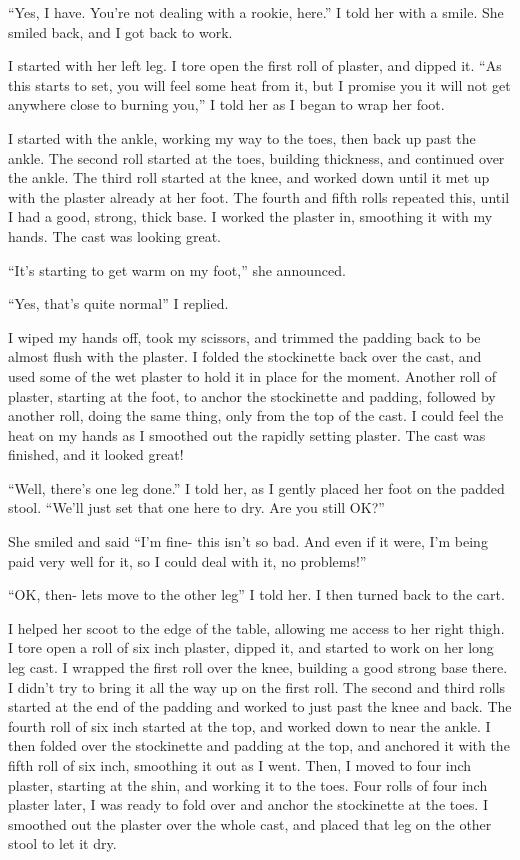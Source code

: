     ``Yes, I have. You're not dealing with a rookie, here.'' I told her with a smile. She smiled
back, and I got back to work.

    I started with her left leg. I tore open the first roll of plaster, and dipped it. ``As this
starts to set, you will feel some heat from it, but I promise you it will not get anywhere close
to burning you,'' I told her as I began to wrap her foot.

    I started with the ankle, working my way to the toes, then back up past the ankle. The
second roll started at the toes, building thickness, and continued over the ankle. The third
roll started at the knee, and worked down until it met up with the plaster already at her foot.
The fourth and fifth rolls repeated this, until I had a good, strong, thick base. I worked the
plaster in, smoothing it with my hands. The cast was looking great.

    ``It's starting to get warm on my foot,'' she announced.

    ``Yes, that's quite normal'' I replied.

    I wiped my hands off, took my scissors, and trimmed the padding back to be almost flush with
the plaster. I folded the stockinette back over the cast, and used some of the wet plaster to
hold it in place for the moment. Another roll of plaster, starting at the foot, to anchor the
stockinette and padding, followed by another roll, doing the same thing, only from the top of
the cast. I could feel the heat on my hands as I smoothed out the rapidly setting plaster. The
cast was finished, and it looked great!

    ``Well, there's one leg done.'' I told her, as I gently placed her foot on the padded stool.
``We'll just set that one here to dry. Are you still OK?''

    She smiled and said ``I'm fine- this isn't so bad. And even if it were, I'm being paid very
well for it, so I could deal with it, no problems!''

    ``OK, then- lets move to the other leg'' I told her. I then turned back to the cart.

    I helped her scoot to the edge of the table, allowing me access to her right thigh. I tore
open a roll of six inch plaster, dipped it, and started to work on her long leg cast. I wrapped
the first roll over the knee, building a good strong base there. I didn't try to bring it all
the way up on the first roll. The second and third rolls started at the end of the padding and
worked to just past the knee and back. The fourth roll of six inch started at the top, and
worked down to near the ankle. I then folded over the stockinette and padding at the top, and
anchored it with the fifth roll of six inch, smoothing it out as I went. Then, I moved to four
inch plaster, starting at the shin, and working it to the toes. Four rolls of four inch plaster
later, I was ready to fold over and anchor the stockinette at the toes. I smoothed out the
plaster over the whole cast, and placed that leg on the other stool to let it dry.


